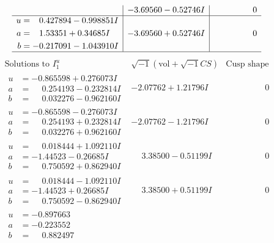 \documentclass[1p]{elsarticle_modified}
\theoremstyle{definition}
\newcommand{\I}{\sqrt{-1}}
\begin{document}
$$\begin{array}{c|c|c}
 & -3.69560 - 0.52746 I & \phantom{-0.000000 } 0 \\ \hline\begin{aligned}
u &= \phantom{-}0.427894 - 0.998851 I \\
a &= \phantom{-}1.53351 + 0.34685 I \\
b &= -0.217091 - 1.043910 I\end{aligned}
 & -3.69560 + 0.52746 I & \phantom{-0.000000 } 0\\
 \hline 
 \end{array}$$\newpage$$\begin{array}{c|c|c}  
\text{Solutions to }I^u_{1}& \I (\text{vol} + \sqrt{-1}CS) & \text{Cusp shape}\\
 \hline 
\begin{aligned}
u &= -0.865598 + 0.276073 I \\
a &= \phantom{-}0.254193 - 0.232814 I \\
b &= \phantom{-}0.032276 - 0.962160 I\end{aligned}
 & -2.07762 + 1.21796 I & \phantom{-0.000000 } 0 \\ \hline\begin{aligned}
u &= -0.865598 - 0.276073 I \\
a &= \phantom{-}0.254193 + 0.232814 I \\
b &= \phantom{-}0.032276 + 0.962160 I\end{aligned}
 & -2.07762 - 1.21796 I & \phantom{-0.000000 } 0 \\ \hline\begin{aligned}
u &= \phantom{-}0.018444 + 1.092110 I \\
a &= -1.44523 - 0.26685 I \\
b &= \phantom{-}0.750592 + 0.862940 I\end{aligned}
 & \phantom{-}3.38500 - 0.51199 I & \phantom{-0.000000 } 0 \\ \hline\begin{aligned}
u &= \phantom{-}0.018444 - 1.092110 I \\
a &= -1.44523 + 0.26685 I \\
b &= \phantom{-}0.750592 - 0.862940 I\end{aligned}
 & \phantom{-}3.38500 + 0.51199 I & \phantom{-0.000000 } 0 \\ \hline\begin{aligned}
u &= -0.897663\phantom{ +0.000000I} \\
a &= -0.223552\phantom{ +0.000000I} \\
b &= \phantom{-}0.882497\phantom{ +0.000000I}\end{aligned}

\end{array}$$
\end{document}
